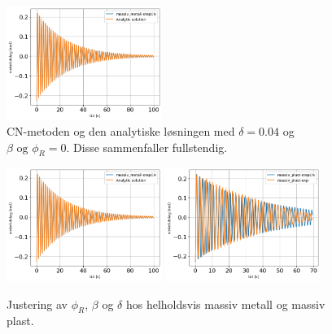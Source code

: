 \begin{figure}[p] 
	\begin{center}
		\includegraphics[width=0.45\textwidth]{img/massiv_metall-stepCN.png}
  
 \end{center}
	\caption{CN-metoden og den analytiske løsningen med \(\delta = 0.04\) og \(\beta \text{ og } \phi_R = 0\). Disse sammenfaller fullstendig.}
	\label{Fig CN} %
\end{figure}

\begin{figure}[p] 
	\begin{center}
            \includegraphics[width=0.45\textwidth]{img/massiv_metall-stepCN.png}
		\includegraphics[width=0.45\textwidth]{img/massiv_plast-stepCN copy.png}
 \end{center}
	\caption{Justering av \(\phi_R\), \(\beta\) og \(\delta\) hos helholdsvis massiv metall og massiv plast.}
	\label{Fig tweaking} %
\end{figure}


